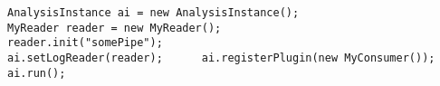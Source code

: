 \begin{lstlisting}[label=listing:AnalysisInstance]
AnalysisInstance ai = new AnalysisInstance();
MyReader reader = new MyReader(); 
reader.init("somePipe"); 
ai.setLogReader(reader); 	  ai.registerPlugin(new MyConsumer());
ai.run();
\end{lstlisting}